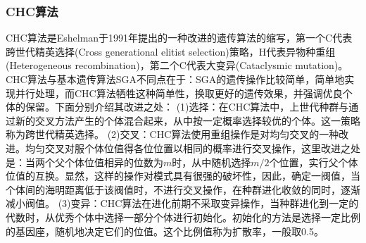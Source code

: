         \subsubsection{CHC算法}
            \par
            CHC算法是Eshelman于1991年提出的一种改进的遗传算法的缩写，第一个C代表跨世代精英选择(Cross generational elitist selection)策略，H代表异物种重组(Heterogeneous recombination)，第二个C代表大变异(Cataclysmic mutation)。CHC算法与基本遗传算法SGA不同点在于：SGA的遗传操作比较简单，简单地实现并行处理，而CHC算法牺牲这种简单性，换取更好的遗传效果，并强调优良个体的保留。下面分别介绍其改进之处：
            (1)选择：在CHC算法中，上世代种群与通过新的交叉方法产生的个体混合起来，从中按一定概率选择较优的个体。这一策略称为跨世代精英选择。
            (2)交叉：CHC算法使用重组操作是对均匀交叉的一种改进。均匀交叉对服个体位值得各位位置以相同的概率进行交叉操作，这里改进之处是：当两个父个体位值相异的位数为$m$时，从中随机选择$m/2$个位置，实行父个体位值的互换。显然，这样的操作对模式具有很强的破坏性，因此，确定一阀值，当个体间的海明距离低于该阀值时，不进行交叉操作，在种群进化收敛的同时，逐渐减小阀值。
            (3)变异：CHC算法在进化前期不采取变异操作，当种群进化到一定的代数时，从优秀个体中选择一部分个体进行初始化。初始化的方法是选择一定比例的基因座，随机地决定它们的位值。这个比例值称为扩散率，一般取0.5。
